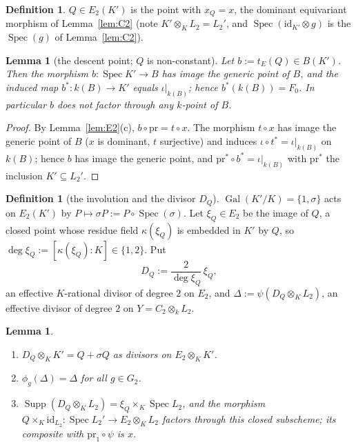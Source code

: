 \documentclass[11pt]{amsart}
\newtheorem{lemma}[theorem]{Lemma}
\theoremstyle{definition}
\newtheorem{definition}[theorem]{Definition}
\theoremstyle{remark}
\newcommand{\Spec}{\operatorname{Spec}}
\newcommand{\Gal}{\operatorname{Gal}}
\newcommand{\Supp}{\operatorname{Supp}}
\begin{document}
\begin{definition}\label{def:Q}
$Q\in E_2(K')$ is the point with $x_Q=x$, the dominant equivariant morphism of
Lemma~\ref{lem:C2} (note $K'\otimes_KL_2=L_2'$, and $\Spec(\mathrm{id}_{K'}\otimes g)$
is the $\Spec(g)$ of Lemma~\ref{lem:C2}).
\end{definition}

\begin{lemma}[the descent point; $Q$ is non-constant]\label{lem:descentpt}
Let $b:=t_E(Q)\in B(K')$. Then the morphism $b\colon\Spec K'\to B$ has image the
generic point of $B$, and the induced map $b^*\colon k(B)\to K'$ equals
$\iota|_{k(B)}$; hence $b^*(k(B))=F_0$. In particular $b$ does not factor through any
$k$-point of $B$.
\end{lemma}

\begin{proof}
By Lemma~\ref{lem:E2}(c), $b\circ\mathrm{pr}=t\circ x$. The morphism $t\circ x$ has
image the generic point of $B$ ($x$ is dominant, $t$ surjective) and induces
$\iota\circ t^*=\iota|_{k(B)}$ on $k(B)$; hence $b$ has image the generic point, and
$\mathrm{pr}^*\circ b^*=\iota|_{k(B)}$ with $\mathrm{pr}^*$ the inclusion $K'\subseteq L_2'$.
\end{proof}

\begin{definition}[the involution and the divisor $D_Q$]\label{def:DQ}
$\Gal(K'/K)=\{1,\sigma\}$ acts on $E_2(K')$ by $P\mapsto\sigma P:=P\circ\Spec(\sigma)$.
Let $\xi_Q\in E_2$ be the image of $Q$, a closed point whose residue field $\kappa(\xi_Q)$
is embedded in $K'$ by $Q$, so $\deg\xi_Q:=[\kappa(\xi_Q):K]\in\{1,2\}$. Put
\[
D_Q:=\frac{2}{\deg\xi_Q}\,\xi_Q ,
\]
an effective $K$-rational divisor of degree $2$ on $E_2$, and
$\Delta:=\psi(D_Q\otimes_KL_2)$, an effective divisor of degree $2$ on $Y=C_2\otimes_kL_2$.
\end{definition}

\begin{lemma}\label{lem:DQ}
\begin{enumerate}[label=\textup{(\alph*)}]
\item $D_Q\otimes_KK'=Q+\sigma Q$ as divisors on $E_2\otimes_KK'$.
\item $\phi_g(\Delta)=\Delta$ for all $g\in G_2$.
\item $\Supp(D_Q\otimes_KL_2)=\xi_Q\times_K\Spec L_2$, and the morphism
$Q\times_K\mathrm{id}_{L_2}\colon\Spec L_2'\to E_2\otimes_KL_2$ factors through this closed
subscheme; its composite with $\mathrm{pr}_1\circ\psi$ is $x$.
\end{enumerate}
\end{lemma}
\end{document}
